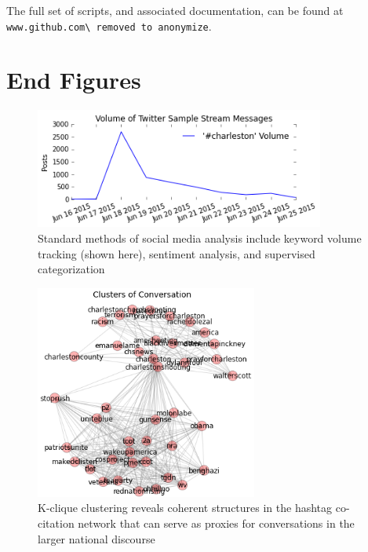 \documentclass[12pt]{article}
\begin{document}
The full set of scripts, and associated documentation, can be found at \verb|www.github.com\ removed to anonymize|. 



{}


\section{End Figures}

\begin{figure}[!ht]
  \centering
    \includegraphics[width=0.85\textwidth]{F1_keyword_volume.png}
    \caption{Standard methods of social media analysis  include keyword volume tracking (shown here),  sentiment analysis, and supervised categorization}
  \label{fig:keyword_vol}
\end{figure}

\begin{figure}[!ht]
  \centering
    \includegraphics[width=0.65\textwidth]{F2_Basic_Clusters.png}
    \caption{K-clique  clustering  reveals  coherent  structures  in the  hashtag  co-citation  network  that  can  serve  as  proxies  for conversations in the larger national discourse}
  \label{fig:basic_clusters}
\end{figure}
\end{document}
